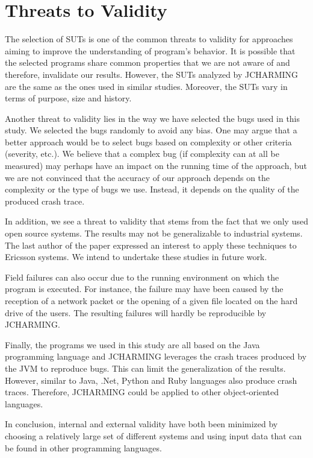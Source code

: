 \documentclass[times]{smrauth}
\begin{document}
\section{Threats to Validity\label{sec:threats}}

The selection of SUTs is one of the common threats to validity
for approaches aiming to improve the understanding of
program's behavior. It is possible that the selected programs
share common properties that we are not aware of and
therefore, invalidate our results. However, the SUTs analyzed
by JCHARMING are the same as the ones used in similar
studies. Moreover, the SUTs vary in terms of purpose, size
and history.

Another threat to validity lies in the way we have selected the
bugs used in this study. We selected the bugs randomly to
avoid any bias. One may argue that a better approach would
be to select bugs based on complexity or other criteria
(severity, etc.). We believe that a complex bug (if complexity
can at all be measured) may perhaps have an impact on the
running time of the approach, but we are not convinced that
the accuracy of our approach depends on the complexity or the
type of bugs we use. Instead, it depends on the quality of the
produced crash trace.

In addition, we see a threat to validity that stems from the fact
that we only used open source systems. The results may not be
generalizable to industrial systems. The last author of the
paper expressed an interest to apply these techniques to
Ericsson systems. We intend to undertake these studies in
future work.

Field failures can also occur due to the running environment
on which the program is executed. For instance, the failure
may have been caused by the reception of a network packet or
the opening of a given file located on the hard drive of the
users. The resulting failures will hardly be reproducible by
JCHARMING.

Finally, the programs we used in this study are all based on
the Java programming language and JCHARMING leverages
the crash traces produced by the JVM to reproduce bugs. This
can limit the generalization of the results. However, similar to
Java, .Net, Python and Ruby languages also produce crash
traces. Therefore, JCHARMING could be applied to other
object-oriented languages.

In conclusion, internal and external validity have both been
minimized by choosing a relatively large set of different
systems and using input data that can be found in other
programming languages.
\end{document}
